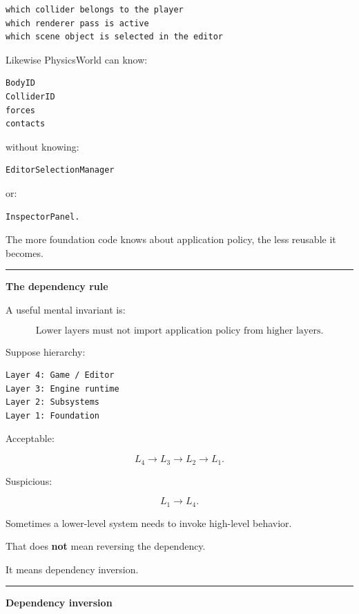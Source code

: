 \begin{verbatim}
which collider belongs to the player
which renderer pass is active
which scene object is selected in the editor
\end{verbatim}

Likewise PhysicsWorld can know:

\begin{verbatim}
BodyID
ColliderID
forces
contacts
\end{verbatim}

without knowing:

\begin{verbatim}
EditorSelectionManager
\end{verbatim}

or:

\begin{verbatim}
InspectorPanel.
\end{verbatim}

The more foundation code knows about application policy, the less reusable it becomes.

\begin{center}\rule{0.5\linewidth}{0.5pt}\end{center}

\textbf{The dependency rule}

A useful mental invariant is:

\[
\boxed{
\text{Lower layers must not import application policy from higher layers.}
}
\]

Suppose hierarchy:

\begin{verbatim}
Layer 4: Game / Editor
Layer 3: Engine runtime
Layer 2: Subsystems
Layer 1: Foundation
\end{verbatim}

Acceptable:

\[
L_4\rightarrow L_3\rightarrow L_2\rightarrow L_1.
\]

Suspicious:

\[
L_1\rightarrow L_4.
\]

Sometimes a lower-level system needs to invoke high-level behavior.

That does \textbf{not} mean reversing the dependency.

It means dependency inversion.

\begin{center}\rule{0.5\linewidth}{0.5pt}\end{center}

\textbf{Dependency inversion}

